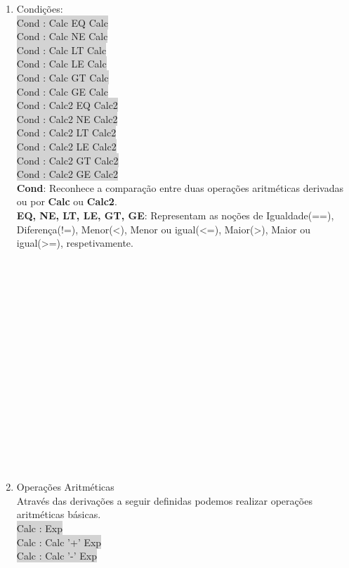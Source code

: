 \documentclass{report}
\begin{document}
\begin{enumerate}
\item{Condições}:\\
\colorbox{lightgray}{Cond : Calc EQ Calc}\\
\colorbox{lightgray}{Cond : Calc NE Calc}\\
\colorbox{lightgray}{Cond : Calc LT Calc}\\
\colorbox{lightgray}{Cond : Calc LE Calc}\\
\colorbox{lightgray}{Cond : Calc GT Calc}\\
\colorbox{lightgray}{Cond : Calc GE Calc}\\
\colorbox{lightgray}{Cond : Calc2 EQ Calc2}\\
\colorbox{lightgray}{Cond : Calc2 NE Calc2}\\
\colorbox{lightgray}{Cond : Calc2 LT Calc2}\\
\colorbox{lightgray}{Cond : Calc2 LE Calc2}\\
\colorbox{lightgray}{Cond : Calc2 GT Calc2}\\
\colorbox{lightgray}{Cond : Calc2 GE Calc2}\\
\textbf{Cond}: Reconhece a comparação entre duas operações aritméticas derivadas ou por \textbf{Calc} ou \textbf{Calc2}.\\
\textbf{EQ, NE, LT, LE, GT, GE}: Representam as noções de Igualdade(==), Diferença(!=), Menor(\textless), Menor ou igual(\textless =), Maior(\textgreater), Maior ou igual(\textgreater =), respetivamente.
\\
\\
\\
\\
\\
\\
\\
\\
\\
\\
\\
\\
\\
\\
\\
\\
\\

\item{Operações Aritméticas}\\
Através das derivações a seguir definidas podemos realizar operações aritméticas básicas.\\
\colorbox{lightgray}{Calc : Exp}\\
\colorbox{lightgray}{Calc : Calc '+' Exp}\\
\colorbox {lightgray}{Calc : Calc '-' Exp}\\


\end{enumerate}
\end{document}
